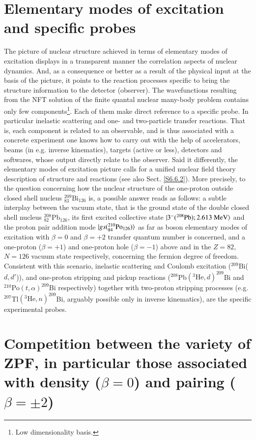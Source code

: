 





\section{Elementary modes of excitation and specific probes}
The picture of nuclear structure achieved in terms of elementary modes of excitation displays in a transparent manner the correlation aspects of nuclear dynamics. And, as a consequence or better as a result of the physical input at the basis of the picture, it points to the reaction processes specific to bring the structure information to the detector (observer). The wavefunctions resulting from the NFT solution of the finite quantal nuclear many-body problem contains only few components\footnote{Low dimensionality basis.}. Each of them make direct reference to a specific probe. In particular inelastic scattering and one- and two-particle transfer reactions. That is, each component is related to an observable, and is thus associated with a concrete experiment one knows how to carry out with the help of accelerators, beams (in e.g. inverse kinematics), targets (active or less), detectors and softwares, whose output directly relate to the observer. Said it differently, the elementary modes of excitation picture calls for a unified nuclear field theory description of structure and reactions (see also Sect. \ref{S6.6.2}). More precisely, to the question concerning how the nuclear structure of the one-proton outside closed shell nucleus $^{209}_{83}$Bi$_{126}$ is, a possible answer reads as follows: a subtle interplay between the vacuum state, that is the ground state of the double closed shell nucleus $^{208}_{82}$Pb$_{126}$, its first excited collective state $|{3^-(^{208}\text{Pb});2.613\text{ MeV}} \rangle$ and the proton pair addition mode $|{gs(^{210}_{84}\text{Po}_{126})} \rangle$ as far as boson elementary modes of excitation with $\beta=0$ and $\beta=+2$ transfer quantum number is concerned, and a one-proton ($\beta=+1$) and one-proton hole ($\beta=-1$) above and in the $Z=82$, $N=126$ vacuum state respectively, concerning the fermion degree of freedom. Consistent with this scenario, inelastic scattering and Coulomb excitation ($^{209}$Bi($d,d'$)),  and one-proton stripping and pickup reactions ($^{208}$Pb$(^3\text{He},d)^{209}$Bi and $^{210}$Po$(t,\alpha)^{209}$Bi respectively) together with two-proton stripping processes (e.g. $^{207}$Tl$(^3\text{He},n)^{209}$Bi, arguably possible only in inverse kinematics), are the specific experimental probes.
\section[Competition between ZPF]{Competition between the variety of ZPF, in particular those associated with density ($\beta=0$) and pairing ($\beta=\pm2$)}\label{appintroF}

